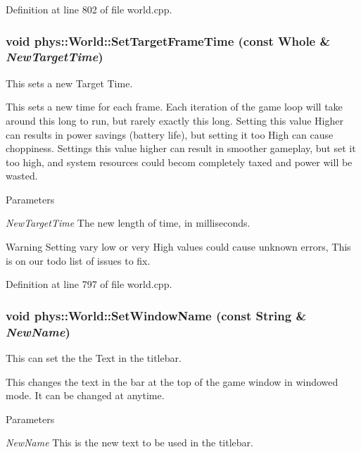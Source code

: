 Definition at line 802 of file world.cpp.

\hypertarget{classphys_1_1World_ad95b5a5ad73e0a05826b5bd834876333}{
\subsubsection[{SetTargetFrameTime}]{\setlength{\rightskip}{0pt plus 5cm}void phys::World::SetTargetFrameTime (const {\bf Whole} \& {\em NewTargetTime})}}
\label{da/ddf/classphys_1_1World_ad95b5a5ad73e0a05826b5bd834876333}


This sets a new Target Time. 

This sets a new time for each frame. Each iteration of the game loop will take around this long to run, but rarely exactly this long. Setting this value Higher can results in power savings (battery life), but setting it too High can cause choppiness. Settings this value higher can result in smoother gameplay, but set it too high, and system resources could becom completely taxed and power will be wasted. 
\begin{DoxyParams}{Parameters}
\item[{\em NewTargetTime}]The new length of time, in milliseconds. \end{DoxyParams}
\begin{DoxyWarning}{Warning}
Setting vary low or very High values could cause unknown errors, This is on our todo list of issues to fix. 
\end{DoxyWarning}


Definition at line 797 of file world.cpp.

\hypertarget{classphys_1_1World_acd0dff342c08fe3008226488b7c53d97}{
\subsubsection[{SetWindowName}]{\setlength{\rightskip}{0pt plus 5cm}void phys::World::SetWindowName (const {\bf String} \& {\em NewName})}}
\label{da/ddf/classphys_1_1World_acd0dff342c08fe3008226488b7c53d97}


This can set the the Text in the titlebar. 

This changes the text in the bar at the top of the game window in windowed mode. It can be changed at anytime. 
\begin{DoxyParams}{Parameters}
\item[{\em NewName}]This is the new text to be used in the titlebar. \end{DoxyParams}


